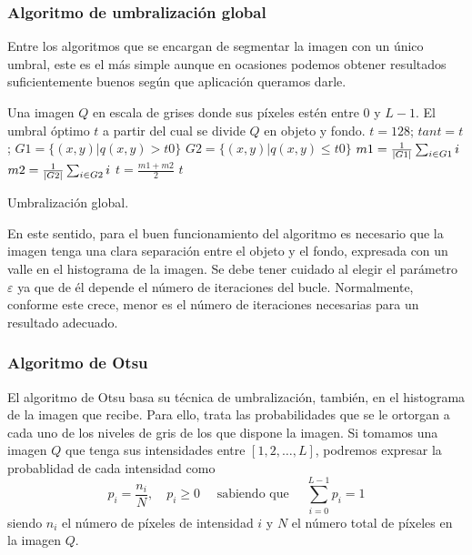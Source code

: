 \documentclass[main]{subfiles}
\begin{document}
\subsubsection{Algoritmo de umbralización global}\label{sec:algoritmoglobal}

Entre los algoritmos que se encargan de segmentar la imagen con un único umbral, este es el más simple aunque en ocasiones podemos obtener resultados suficientemente buenos según que aplicación queramos darle.

\begin{algorithm}[!ht]
\begin{algorithmic}[1]
\REQUIRE Una imagen $Q$ en escala de grises donde sus píxeles estén entre $0$ y $L-1$.
\ENSURE El umbral óptimo $t$ a partir del cual se divide $Q$ en objeto y fondo.
\STATE $t = 128$;
\REPEAT
\STATE $tant = t$;
\STATE $G1 = \{(x, y) | q(x, y) > t0\}$
\STATE $G2 = \{(x, y) | q(x, y) \leq t0\}$
\STATE $m1 = \frac{1}{\left\vert G1\right\vert} \sum_{i\in G1} i$
\STATE $m2 = \frac{1}{\left\vert G2\right\vert} \sum_{i\in G2} i$
\STATE $t = \frac{m1+m2}{2}$
\RETURN $t$
\end{algorithmic}
\caption{Umbralización global.}\label{alg:global}
\end{algorithm}

En este sentido, para el buen funcionamiento del algoritmo es necesario que la imagen tenga una clara separación entre el objeto y el fondo, expresada con un valle en el histograma de la imagen. Se debe tener cuidado al elegir el parámetro $\varepsilon$ ya que de él depende el número de iteraciones del bucle. Normalmente, conforme este crece, menor es el número de iteraciones necesarias para un resultado adecuado.


\subsubsection{Algoritmo de Otsu}\label{sec:algoritmootsu}

El algoritmo de Otsu \cite{art:otsu} basa su técnica de umbralización, también, en el histograma de la imagen que recibe. Para ello, trata las probabilidades que se le ortorgan a cada uno de los niveles de gris de los que dispone la imagen. Si tomamos una imagen $Q$ que tenga sus intensidades entre $[1, 2, \dots, L]$, podremos expresar la probablidad de cada intensidad como
$$p_i = \frac{n_i}{N}, \quad p_i \geq 0\quad\text{ sabiendo que }\quad\sum_{i=0}^{L-1}p_i=1$$
siendo $n_i$ el número de píxeles de intensidad $i$ y $N$ el número total de píxeles en la imagen $Q$.
\end{document}
